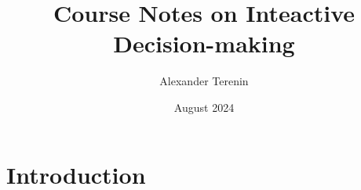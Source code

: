 \documentclass{article}
\title{Course Notes on Inteactive Decision-making}
\author{Alexander Terenin}
\date{August 2024}
\begin{document}
\maketitle

\section{Introduction}
\end{document}
